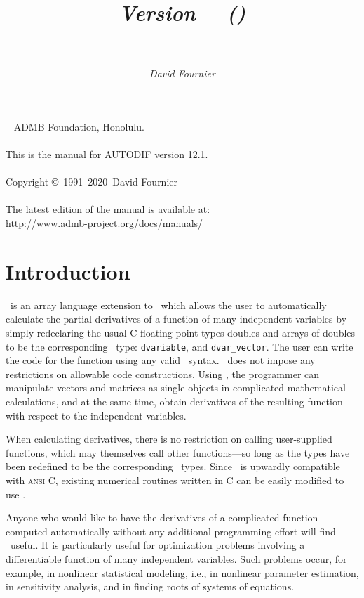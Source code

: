 \documentclass{admbmanual}
\title{%
  \largetitlepart{AUTODIF}
  \smalltitlepart{%
    A \cplus\ Array Language Extension\\
    with Automatic Differentiation\\
    for Use in Nonlinear Modeling and Statistics}
  \vspace{4ex}\textsf{\textit{Version \admbversion~~(\admbdate)\\[3pt]
      ~%
    }}\vspace{3ex}
}
\author{\textsf{\textit{David Fournier}}}
\newcommand\admbversion{12.1}
\newcommand\admbyear{2020}
\newcommand{\question}[1]{\bigskip\noindent{\bf #1?}\par\medskip\noindent}
\begin{document}
\maketitle

~\vfill
\noindent ADMB Foundation, Honolulu.\\\\
\noindent This is the manual for AUTODIF version \admbversion.\\\\
\noindent Copyright \copyright\ 1991--\admbyear\ David Fournier\\\\
\noindent The latest edition of the manual is available at:\\
\url{http://www.admb-project.org/docs/manuals/}

\tableofcontents

\chapter{Introduction}
\label{ch:introduction}

\question{What is \scAD}
\scAD\ is an array language extension to \cplus\ which allows the user to
automatically calculate the partial derivatives of a function of many
independent variables by simply redeclaring the usual C floating point types
doubles and arrays of doubles to be the corresponding \scAD\ type:
\texttt{dvariable}, and \texttt{dvar\_vector}. The user can write the code for
the function using any valid \cplus\ syntax. \scAD\ does not impose any
restrictions on allowable code constructions. Using \scAD, the programmer can
manipulate vectors and matrices as single objects in complicated mathematical
calculations, and at the same time, obtain derivatives of the resulting function
with respect to the independent variables.

When calculating derivatives, there is no restriction on calling user-supplied
functions, which may themselves call other functions---so long as the types have
been redefined to be the corresponding \scAD\ types. Since \cplus\ is upwardly
compatible with \textsc{ansi C}, existing numerical routines written in C can be
easily modified to use \scAD.

\question{Who should use \scAD}
Anyone who would like to have the derivatives of a complicated function computed
automatically without any additional programming effort will find \scAD\ useful.
It is particularly useful for optimization problems involving a differentiable
function of many independent variables. Such problems occur, for example, in
nonlinear statistical modeling, i.e., in nonlinear parameter estimation, in
sensitivity analysis, and in finding roots of systems of equations.
\end{document}
